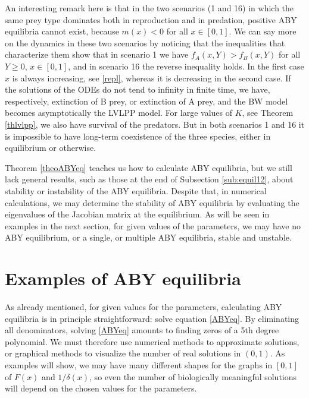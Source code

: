 \documentclass[12pt]{article}
\theoremstyle{definition}
\begin{document}
An interesting remark here is that in the two scenarios (1 and 16) in which the same prey type dominates both in reproduction and in predation, positive ABY equilibria cannot exist, because $m(x)<0$ for all $x\in [0,1]$. We can say more on the dynamics in these two scenarios by noticing that the inequalities that characterize them show that in scenario 1 we have $f_A(x,Y)>f_B(x,Y)$ for all $Y\geq 0$, $x \in [0,1]$, and in scenario 16 the reverse inequality holds. In the first case $x$ is always increasing, see \eqref{repl}, whereas it is decreasing in the second case. If the solutions of the ODEs do not tend to infinity in finite time, we have, respectively, extinction of B prey, or extinction of A prey, and the BW model becomes asymptotically the LVLPP model. For large values of $K$, see Theorem \ref{thlvlpp}, we also have survival of the predators. But in both scenarios 1 and 16 it is impossible to have long-term coexistence of the three species, either in equilibrium or otherwise.

Theorem \ref{theoABYeq} teaches us how to calculate ABY equilibria, but we still lack general results, such as those at the end of Subsection \ref{sub:equil12}, about stability or instability of the ABY equilibria. Despite that, in numerical calculations, we may determine the stability of ABY equilibria by evaluating the eigenvalues of the Jacobian matrix at the equilibrium. As will be seen in examples in the next section, for given values of the parameters, we may have no ABY equilibrium, or a single, or multiple ABY equilibria, stable and unstable.


\section{Examples of ABY equilibria}  \label{sec:ABYeq}
As already mentioned, for given values for the parameters, calculating ABY equilibria is in principle straightforward: solve equation \eqref{ABYeq}. By eliminating all denominators, solving \eqref{ABYeq} amounts to finding zeros of a 5th degree polynomial. We must therefore use numerical methods to approximate solutions, or graphical methods to visualize the number of real solutions in $(0,1)$. As examples will show, we may have many different shapes for the graphs in $[0,1]$ of $F(x)$ and $1/\delta(x)$, so even the number of biologically meaningful solutions will depend on the chosen values for the parameters.
\end{document}
